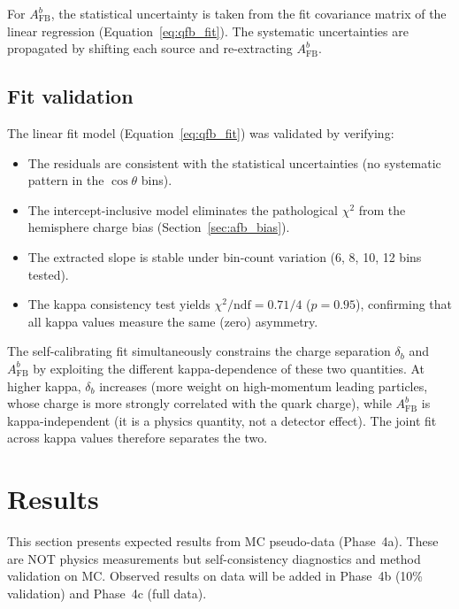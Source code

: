 \documentclass[11pt,a4paper]{article}
\begin{document}
For $A_\mathrm{FB}^b$, the statistical uncertainty is taken from the fit
covariance matrix of the linear regression (Equation~\ref{eq:qfb_fit}).
The systematic uncertainties are propagated by shifting each source and
re-extracting $A_\mathrm{FB}^b$.

\subsection{Fit validation}
\label{sec:fit_validation}

The linear fit model (Equation~\ref{eq:qfb_fit}) was validated by verifying:
\begin{itemize}
\item The residuals are consistent with the statistical uncertainties (no systematic
pattern in the $\cos\theta$ bins).
\item The intercept-inclusive model eliminates the pathological $\chi^2$ from the
hemisphere charge bias (Section~\ref{sec:afb_bias}).
\item The extracted slope is stable under bin-count variation (6, 8, 10, 12 bins
tested).
\item The kappa consistency test yields $\chi^2/\mathrm{ndf} = 0.71/4$
($p = 0.95$), confirming that all kappa values measure the same (zero) asymmetry.
\end{itemize}

The self-calibrating fit simultaneously constrains the charge separation $\delta_b$
and $A_\mathrm{FB}^b$ by exploiting the different kappa-dependence of these two
quantities. At higher kappa, $\delta_b$ increases (more weight on high-momentum
leading particles, whose charge is more strongly correlated with the quark charge),
while $A_\mathrm{FB}^b$ is kappa-independent (it is a physics quantity, not a
detector effect). The joint fit across kappa values therefore separates the two.

\FloatBarrier
{}
\section{Results}
\label{sec:results}

This section presents expected results from MC pseudo-data (Phase~4a). These are
NOT physics measurements but self-consistency diagnostics and method validation
on MC. Observed results on data will be added in Phase~4b (10\% validation) and
Phase~4c (full data).
\end{document}
